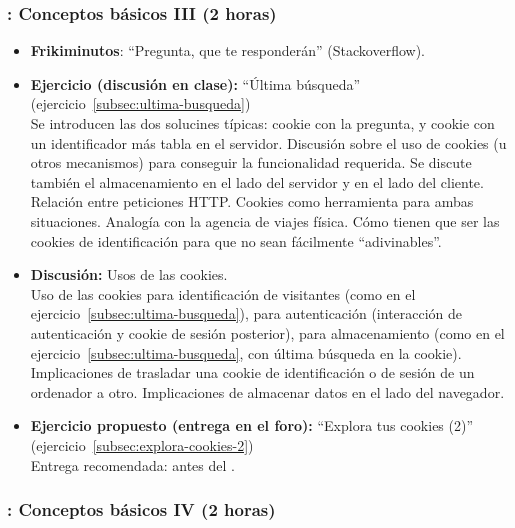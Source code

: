 \documentclass[a4paper,12pt]{article}
\begin{document}
\subsubsection{\lunesC: Conceptos básicos III (2 horas)}
\label{cal:lunesC}

\begin{itemize}
\item \textbf{Frikiminutos}: ``Pregunta, que te responderán'' (Stackoverflow).
\item \textbf{Ejercicio (discusión en clase):} ``Última búsqueda'' (ejercicio~\ref{subsec:ultima-busqueda}) \\
  Se introducen las dos solucines típicas: cookie con la pregunta, y cookie con un identificador más tabla en el servidor.
  Discusión sobre el uso de cookies (u otros mecanismos) para conseguir la funcionalidad requerida. Se discute también el almacenamiento en el lado del servidor y en el lado del cliente. Relación entre peticiones HTTP. Cookies como herramienta para ambas situaciones. Analogía con la agencia de viajes física. Cómo tienen que ser las cookies de identificación para que no sean fácilmente ``adivinables''.
\item \textbf{Discusión:} Usos de las cookies. \\
  Uso de las cookies para identificación de visitantes (como en el ejercicio~\ref{subsec:ultima-busqueda}), para autenticación (interacción de autenticación y cookie de sesión posterior), para almacenamiento (como en el ejercicio~\ref{subsec:ultima-busqueda}, con última búsqueda en la cookie). Implicaciones de trasladar una cookie de identificación o de sesión de un ordenador a otro. Implicaciones de almacenar datos en el lado del navegador.
\item \textbf{Ejercicio propuesto (entrega en el foro):} ``Explora tus cookies (2)'' (ejercicio~\ref{subsec:explora-cookies-2}) \\
  Entrega recomendada: antes del \lunesD.
\end{itemize}


\subsubsection{\lunesD: Conceptos básicos IV (2 horas)}
\label{cal:lunesD}
\end{document}

